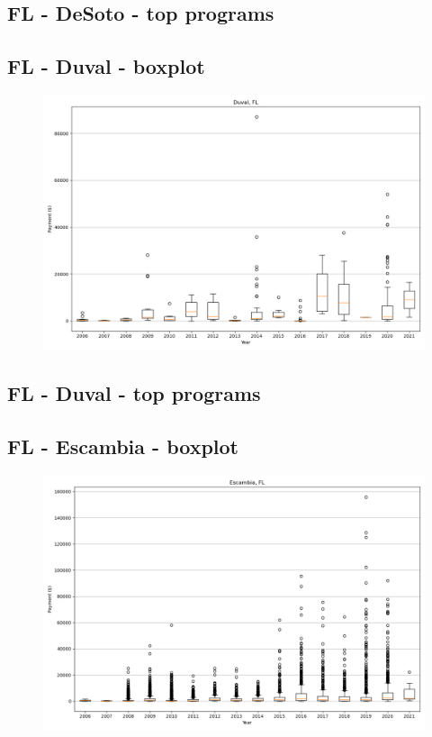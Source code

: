 \subsection*{FL - DeSoto - top programs}

\newpage
\subsection*{FL - Duval - boxplot}
\begin{figure}[h]
\centering
\includegraphics[width=7in]{../output/boxplots/counties/Duval-FL_boxplot.png}
\end{figure}


\subsection*{FL - Duval - top programs}

\newpage
\subsection*{FL - Escambia - boxplot}
\begin{figure}[h]
\centering
\includegraphics[width=7in]{../output/boxplots/counties/Escambia-FL_boxplot.png}
\end{figure}


